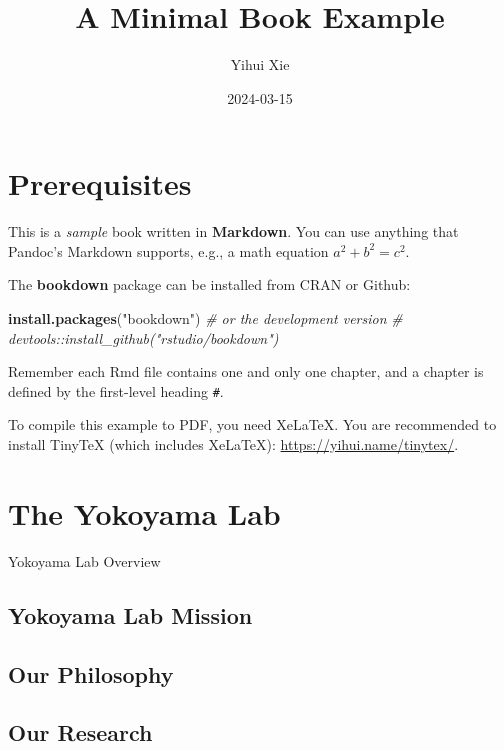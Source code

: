 \documentclass[
]{book}
\title{A Minimal Book Example}
\author{Yihui Xie}
\date{2024-03-15}
\newenvironment{Shaded}{\begin{snugshade}}{\end{snugshade}}
\newcommand{\CommentTok}[1]{\textcolor[rgb]{0.56,0.35,0.01}{\textit{#1}}}
\newcommand{\FunctionTok}[1]{\textcolor[rgb]{0.13,0.29,0.53}{\textbf{#1}}}
\newcommand{\NormalTok}[1]{#1}
\newcommand{\StringTok}[1]{\textcolor[rgb]{0.31,0.60,0.02}{#1}}
\begin{document}
\maketitle

{
\setcounter{tocdepth}{1}
\tableofcontents
}
\hypertarget{prerequisites}{%
\chapter{Prerequisites}\label{prerequisites}}

This is a \emph{sample} book written in \textbf{Markdown}. You can use anything that Pandoc's Markdown supports, e.g., a math equation \(a^2 + b^2 = c^2\).

The \textbf{bookdown} package can be installed from CRAN or Github:

\begin{Shaded}
\begin{Highlighting}[]
\FunctionTok{install.packages}\NormalTok{(}\StringTok{"bookdown"}\NormalTok{)}
\CommentTok{\# or the development version}
\CommentTok{\# devtools::install\_github("rstudio/bookdown")}
\end{Highlighting}
\end{Shaded}

Remember each Rmd file contains one and only one chapter, and a chapter is defined by the first-level heading \texttt{\#}.

To compile this example to PDF, you need XeLaTeX. You are recommended to install TinyTeX (which includes XeLaTeX): \url{https://yihui.name/tinytex/}.

\hypertarget{the-lab}{%
\chapter{The Yokoyama Lab}\label{the-lab}}

Yokoyama Lab Overview

\hypertarget{lab-mission}{%
\section{Yokoyama Lab Mission}\label{lab-mission}}

\hypertarget{lab-philosophy}{%
\section{Our Philosophy}\label{lab-philosophy}}

\hypertarget{our-research}{%
\section{Our Research}\label{our-research}}
\end{document}
